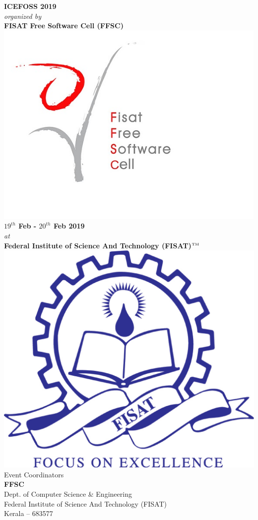 \documentclass[notuble,10pt,a4paper]{leaflet}
\begin{document}
\begin{center}
{\large \textbf{ICEFOSS 2019}} \\[.3cm]
\textit{organized by}\\[.4cm]
{\large \textbf{FISAT Free Software Cell (FFSC)}}\\ [.3cm]
\includegraphics[scale=.3]{data/ffsc.jpg}\\
\textbf{{\large $19^{th}$ Feb - $20^{th}$ Feb 2019}}\\[.5cm]
\textit{{\small at}}\\[.3cm]
{\large\textbf{ Federal Institute of Science And Technology (FISAT)$^{\tiny{\mbox{TM}}}$}} \\[.4cm]
\includegraphics[scale=.13]{logod}\\
\vfill
Event Coordinators\\ 
\textbf{FFSC}\\
Dept. of Computer Science \& Engineering\\
Federal Institute of Science And Technology (FISAT)\\
Kerala – 683577
\end{center}
\end{document}

